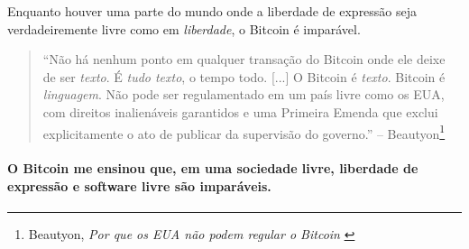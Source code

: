 Enquanto houver uma parte do mundo onde a liberdade de expressão seja verdadeiremente livre como em \textit{liberdade}, o Bitcoin é imparável.

\begin{quotation}\begin{samepage}
\begin{flushright}
\enquote{Não há nenhum ponto em qualquer transação do Bitcoin onde ele deixe de ser \textit{texto}. É \textit{tudo texto}, o tempo todo. [...] O Bitcoin é \textit{texto}. Bitcoin é \textit{linguagem}. Não pode ser regulamentado em um país livre como os EUA, com direitos inalienáveis garantidos e uma Primeira Emenda que exclui explicitamente o ato de publicar da supervisão do governo.}
-- Beautyon\footnote{Beautyon, \textit{Por que os EUA não podem regular o Bitcoin} \cite{america-regulate-bitcoin}}
\end{flushright}\end{samepage}\end{quotation}

\paragraph{O Bitcoin me ensinou que, em uma sociedade livre, liberdade de expressão e software livre são imparáveis.}

%
%
%
%
%
%
%
